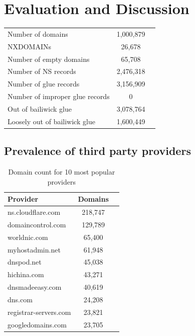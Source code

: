\documentclass{idc_msc}
\begin{document}




\section{Evaluation and Discussion}

\begin{table}
\begin{tabular}{l|cc}
 & & \\
 \hline
 Number of domains & 1,000,879 & \\
 NXDOMAINs & 26,678 & \\
 Number of empty domains & 65,708 & \\
 Number of NS records & 2,476,318 & \\
 Number of glue records & 3,156,909 & \\
 Number of improper glue records & 0 & \\
 Out of bailiwick glue & 3,078,764 & \\
 Loosely out of bailiwick glue & 1,600,449 & \\
\end{tabular}
\end{table}

\subsection{Prevalence of third party providers}

\begin{table}
\begin{tabular}{l|cc}
 Provider & Domains & \\
 \hline
 ns.cloudflare.com & 218,747 & \\
 domaincontrol.com & 129,789 & \\
 worldnic.com & 65,400 & \\
 myhostadmin.net & 61,948 & \\
 dnspod.net & 45,038 & \\
 hichina.com & 43,271 & \\
 dnsmadeeasy.com & 40,619 & \\
 dns.com & 24,208 & \\
 registrar-servers.com & 23,821 & \\
 googledomains.com & 23,705 & \\
\end{tabular}
\caption{Domain count for 10 most popular providers}
\end{table}
\end{document}
